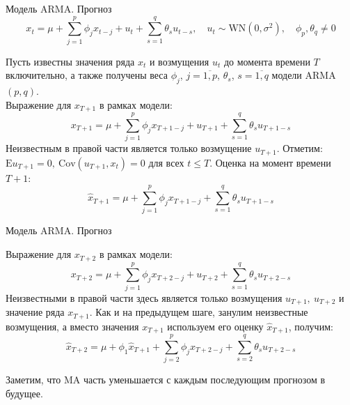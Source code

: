 \begin{frame}{Модель ARMA. Прогноз}
\begin{equation*}
x_t = \mu + \sum_{j=1}^{p}\phi_j x_{t-j} + u_t + \sum_{s=1}^{q}\theta_s u_{t-s},
\quad u_t \sim \text{WN}(0, \sigma^2),\quad  \phi_p,\theta_q \neq 0
\end{equation*}

Пусть известны значения ряда $x_t$ и возмущения $u_t$ до момента времени $T$ включительно, а также получены веса $\phi_j$, $j = \overline{1, p}$, $\theta_s$, $s = \overline{1,q}$ модели ARMA$(p,q)$. \\
Выражение для $x_{T+1}$ в рамках модели:
\begin{equation*}
x_{T+1} = \mu + \sum_{j=1}^{p}\phi_j x_{T+1-j} + u_{T+1} + \sum_{s=1}^{q}\theta_s u_{T+1-s}
\end{equation*}
Неизвестным в правой части является только возмущение $u_{T+1}$. Отметим: $\mathrm{E}u_{T+1} = 0, \ \mathrm{Cov}(u_{T+1}, x_t) = 0$ для всех $t \leq T$. Оценка на момент времени $T+1$:
\begin{equation*}
\hat{x}_{T+1} = \mu + \sum_{j=1}^{p}\phi_j x_{T+1-j} + \sum_{s=1}^{q}\theta_s u_{T+1-s}
\end{equation*}

\end{frame}


\begin{frame}{Модель ARMA. Прогноз}

Выражение для $x_{T+2}$ в рамках модели:
\begin{equation*}
x_{T+2} = \mu + \sum_{j=1}^{p}\phi_j x_{T+2-j} + u_{T+2} + \sum_{s=1}^{q}\theta_s u_{T+2-s}
\end{equation*}
Неизвестными в правой части здесь является только возмущения $u_{T+1}, \ u_{T+2}$ и значение ряда $x_{T+1}$. Как и на предыдущем шаге, занулим неизвестные возмущения, а вместо значения $x_{T+1}$ используем его оценку $\hat{x}_{T+1}$, получим:
\begin{equation*}
\hat{x}_{T+2} = \mu + \phi_1 \hat{x}_{T+1} +  \sum_{j=2}^{p}\phi_j x_{T+2-j} + \sum_{s=2}^{q}\theta_s u_{T+2-s}
\end{equation*}

Заметим, что MA часть уменьшается с каждым последующим прогнозом в будущее.

\end{frame}


